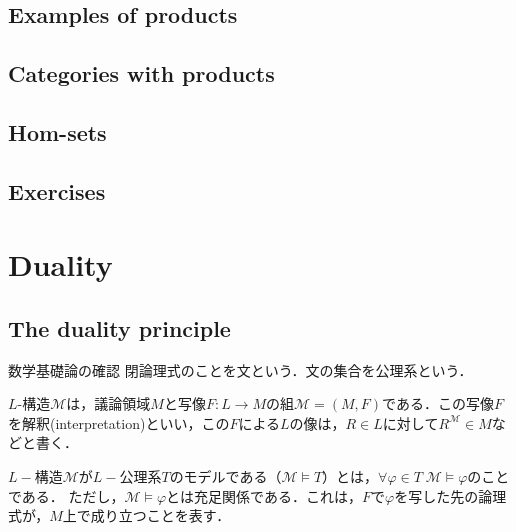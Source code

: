 \documentclass[uplatex, dvipdfmx]{jsarticle}
\begin{document}
\subsection{Examples of products}

\begin{remark}
    
\end{remark}



\subsection{Categories with products}

\begin{definition}
    
\end{definition}

\subsection{Hom-sets}
\begin{proposition}
    
\end{proposition}

\begin{definition}
    
\end{definition}

\begin{corollary}[表現可能関手は積を保存する]\label{corollary-representable-functors-preserve-limits}
    
\end{corollary}
\subsection{Exercises}

\section{Duality}

\subsection{The duality principle}

\begin{itembox}[l]{数学基礎論の確認}
    閉論理式のことを文という．文の集合を公理系という．

    $L$-構造$\mathcal{M}$は，議論領域$M$と写像$F:L\to M$の組$\mathcal{M}=(M,F)$である．この写像$F$を解釈(interpretation)といい，この$F$による$L$の像は，$R\in L$に対して$R^\mathcal{M}\in M$などと書く．

    $L-$構造$\mathcal{M}$が$L-$公理系$T$のモデルである（$\mathcal{M}\models T$）とは，$\forall\varphi\in T\; \mathcal{M}\models \varphi$のことである．
    ただし，$\mathcal{M}\models\varphi$とは充足関係である．これは，$F$で$\varphi$を写した先の論理式が，$M$上で成り立つことを表す．
\end{itembox}
\end{document}
